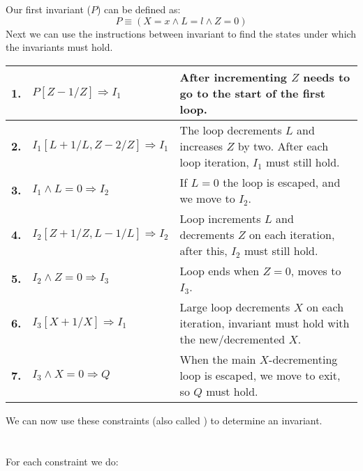 \documentclass{report}
\begin{document}
\begin{itemize}
{                
                Our first invariant ($P$) can be defined as:
                \[P \equiv (X =x  \land L = l \land Z = 0)\]
                Next we can use the instructions between invariant to find the states under which the invariants must hold.
                \begin{center}
                    \begin{tabular}{l l p{}}
                    \textbf{1.} & $P[Z-1/Z] \Rightarrow I_1$ & After incrementing $Z$ needs to go to the start of the first loop. \\
                    \hline
                    \textbf{2.} & $I_1[L + 1/L, Z - 2/Z] \Rightarrow I_1$ & The loop decrements $L$ and increases $Z$ by two. After each loop iteration, $I_1$ must still hold. \\
                    \hline
                    \textbf{3.} & $I_1 \land L = 0 \Rightarrow I_2$ & If $L = 0$ the loop is escaped, and we move to $I_2$. \\
                    \hline
                    \textbf{4.} & $I_2[Z+1/Z,L-1/L] \Rightarrow I_2$ & Loop increments $L$ and decrements $Z$ on each iteration, after this, $I_2$ must still hold. \\
                    \hline
                    \textbf{5.} & $I_2 \land Z = 0 \Rightarrow I_3$ & Loop ends when $Z = 0$, moves to $I_3$. \\
                    \hline
                    \textbf{6.} & $I_3[X+1/X] \Rightarrow I_1$ & Large loop decrements $X$ on each iteration, invariant must hold with the new/decremented $X$. \\
                    \hline
                    \textbf{7.} & $I_3 \land X = 0 \Rightarrow Q$ & When the main $X$-decrementing loop is escaped, we move to exit, so $Q$ must hold.
                    \end{tabular}
                \end{center}
                We can now use these constraints (also called ) to determine an invariant.
                \\
                \\
                \\ For each constraint we do:

}
\end{itemize}
\end{document}
